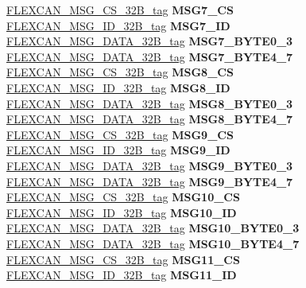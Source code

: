 \begin{DoxyCompactItemize}
\begin{tabbing}
\>\>\mbox{\hyperlink{unionFLEXCAN__MSG__CS__32B__tag}{FLEXCAN\_MSG\_CS\_32B\_tag}} {\bfseries MSG7\_CS}\\
\>\>\mbox{\hyperlink{unionFLEXCAN__MSG__ID__32B__tag}{FLEXCAN\_MSG\_ID\_32B\_tag}} {\bfseries MSG7\_ID}\\
\>\>\mbox{\hyperlink{unionFLEXCAN__MSG__DATA__32B__tag}{FLEXCAN\_MSG\_DATA\_32B\_tag}} {\bfseries MSG7\_BYTE0\_3}\\
\>\>\mbox{\hyperlink{unionFLEXCAN__MSG__DATA__32B__tag}{FLEXCAN\_MSG\_DATA\_32B\_tag}} {\bfseries MSG7\_BYTE4\_7}\\
\>\>\mbox{\hyperlink{unionFLEXCAN__MSG__CS__32B__tag}{FLEXCAN\_MSG\_CS\_32B\_tag}} {\bfseries MSG8\_CS}\\
\>\>\mbox{\hyperlink{unionFLEXCAN__MSG__ID__32B__tag}{FLEXCAN\_MSG\_ID\_32B\_tag}} {\bfseries MSG8\_ID}\\
\>\>\mbox{\hyperlink{unionFLEXCAN__MSG__DATA__32B__tag}{FLEXCAN\_MSG\_DATA\_32B\_tag}} {\bfseries MSG8\_BYTE0\_3}\\
\>\>\mbox{\hyperlink{unionFLEXCAN__MSG__DATA__32B__tag}{FLEXCAN\_MSG\_DATA\_32B\_tag}} {\bfseries MSG8\_BYTE4\_7}\\
\>\>\mbox{\hyperlink{unionFLEXCAN__MSG__CS__32B__tag}{FLEXCAN\_MSG\_CS\_32B\_tag}} {\bfseries MSG9\_CS}\\
\>\>\mbox{\hyperlink{unionFLEXCAN__MSG__ID__32B__tag}{FLEXCAN\_MSG\_ID\_32B\_tag}} {\bfseries MSG9\_ID}\\
\>\>\mbox{\hyperlink{unionFLEXCAN__MSG__DATA__32B__tag}{FLEXCAN\_MSG\_DATA\_32B\_tag}} {\bfseries MSG9\_BYTE0\_3}\\
\>\>\mbox{\hyperlink{unionFLEXCAN__MSG__DATA__32B__tag}{FLEXCAN\_MSG\_DATA\_32B\_tag}} {\bfseries MSG9\_BYTE4\_7}\\
\>\>\mbox{\hyperlink{unionFLEXCAN__MSG__CS__32B__tag}{FLEXCAN\_MSG\_CS\_32B\_tag}} {\bfseries MSG10\_CS}\\
\>\>\mbox{\hyperlink{unionFLEXCAN__MSG__ID__32B__tag}{FLEXCAN\_MSG\_ID\_32B\_tag}} {\bfseries MSG10\_ID}\\
\>\>\mbox{\hyperlink{unionFLEXCAN__MSG__DATA__32B__tag}{FLEXCAN\_MSG\_DATA\_32B\_tag}} {\bfseries MSG10\_BYTE0\_3}\\
\>\>\mbox{\hyperlink{unionFLEXCAN__MSG__DATA__32B__tag}{FLEXCAN\_MSG\_DATA\_32B\_tag}} {\bfseries MSG10\_BYTE4\_7}\\
\>\>\mbox{\hyperlink{unionFLEXCAN__MSG__CS__32B__tag}{FLEXCAN\_MSG\_CS\_32B\_tag}} {\bfseries MSG11\_CS}\\
\>\>\mbox{\hyperlink{unionFLEXCAN__MSG__ID__32B__tag}{FLEXCAN\_MSG\_ID\_32B\_tag}} {\bfseries MSG11\_ID}\\

\end{tabbing}
\end{DoxyCompactItemize}
